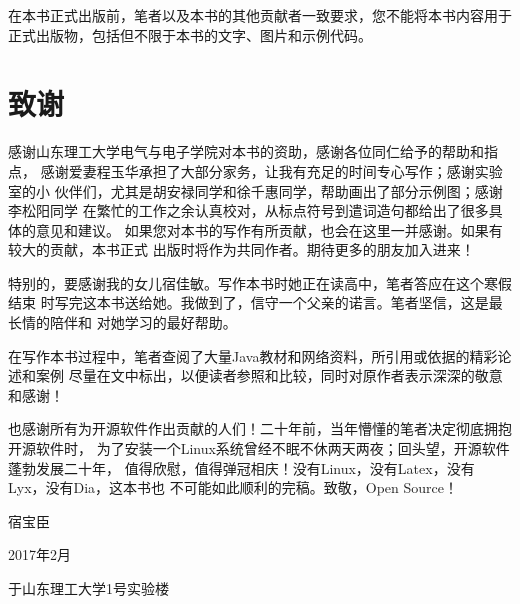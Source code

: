 在本书正式出版前，笔者以及本书的其他贡献者一致要求，您不能将本书内容用于
正式出版物，包括但不限于本书的文字、图片和示例代码。

\section*{致谢}

感谢山东理工大学电气与电子学院对本书的资助，感谢各位同仁给予的帮助和指点，
感谢爱妻程玉华承担了大部分家务，让我有充足的时间专心写作；感谢实验室的小
伙伴们，尤其是胡安禄同学和徐千惠同学，帮助画出了部分示例图；感谢李松阳同学
在繁忙的工作之余认真校对，从标点符号到遣词造句都给出了很多具体的意见和建议。
如果您对本书的写作有所贡献，也会在这里一并感谢。如果有较大的贡献，本书正式
出版时将作为共同作者。期待更多的朋友加入进来！

特别的，要感谢我的女儿宿佳敏。写作本书时她正在读高中，笔者答应在这个寒假结束
时写完这本书送给她。我做到了，信守一个父亲的诺言。笔者坚信，这是最长情的陪伴和
对她学习的最好帮助。

在写作本书过程中，笔者查阅了大量Java教材和网络资料，所引用或依据的精彩论述和案例
尽量在文中标出，以便读者参照和比较，同时对原作者表示深深的敬意和感谢！

也感谢所有为开源软件作出贡献的人们！二十年前，当年懵懂的笔者决定彻底拥抱开源软件时，
为了安装一个Linux系统曾经不眠不休两天两夜；回头望，开源软件蓬勃发展二十年，
值得欣慰，值得弹冠相庆！没有Linux，没有Latex，没有Lyx，没有Dia，这本书也
不可能如此顺利的完稿。致敬，Open Source！

\hfill 宿宝臣

\hfill 2017年2月

\hfill 于山东理工大学1号实验楼
\mainmatter

